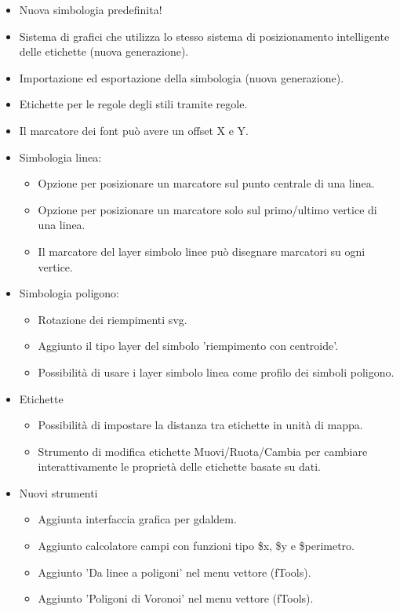 \begin{itemize}[label=--]
\item Nuova simbologia predefinita!
\item Sistema di grafici che utilizza lo stesso sistema di posizionamento intelligente delle etichette (nuova generazione).
\item Importazione ed esportazione della simbologia (nuova generazione).
\item Etichette per le regole degli stili tramite regole.
\item Il marcatore dei font può avere un offset  X e Y.
\item Simbologia linea:
\begin{itemize}[label=--]
\item Opzione per posizionare un marcatore sul punto centrale di una linea.
\item Opzione per posizionare un marcatore solo sul primo/ultimo vertice di una linea.
\item Il marcatore del layer simbolo linee può disegnare marcatori su ogni vertice.
\end{itemize}
\item Simbologia poligono:
\begin{itemize}[label=--]
\item Rotazione dei riempimenti svg.
\item Aggiunto il tipo layer del simbolo 'riempimento con centroide'.
\item Possibilità di usare i layer simbolo linea come profilo dei simboli poligono.
\end{itemize}
\item Etichette
\begin{itemize}[label=--]
\item Possibilità di impostare la distanza tra etichette in unità di mappa.
\item Strumento di modifica etichette Muovi/Ruota/Cambia per cambiare interattivamente 
le proprietà delle etichette basate su dati.
\end{itemize}
\item Nuovi strumenti
\begin{itemize}[label=--]
\item Aggiunta interfaccia grafica per gdaldem.
\item Aggiunto calcolatore campi con funzioni tipo \$x, \$y e \$perimetro.
\item Aggiunto 'Da linee a poligoni' nel menu vettore (fTools).
\item Aggiunto 'Poligoni di Voronoi' nel menu vettore (fTools). 
\end{itemize}
\end{itemize}

